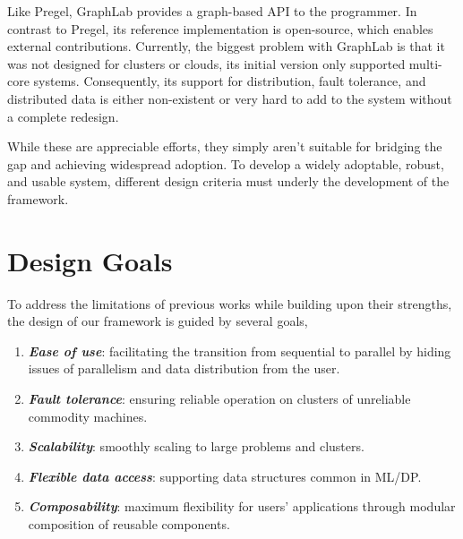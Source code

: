 \documentclass[acmtocl]{acmtrans2m}
\begin{document}
Like Pregel, GraphLab provides a graph-based API to the programmer. In contrast to Pregel, its reference implementation is open-source, which enables external contributions. Currently, the biggest problem with GraphLab is that it was not designed for clusters or clouds, its initial version only supported multi-core systems. Consequently, its support for distribution, fault tolerance, and distributed data is either non-existent or very hard to add to the system without a complete redesign.

While these are appreciable efforts, they simply aren't suitable for bridging the gap and achieving widespread adoption. To develop a widely adoptable, robust, and usable system, different design criteria must underly the development of the framework.



\section{Design Goals}

To address the limitations of previous works while building upon their strengths, the design of our framework is guided by several goals,
\begin{enumerate}
\item {\bf \em Ease of use}: facilitating the transition from sequential to parallel by hiding issues of parallelism and data distribution from the user.
\item {\bf \em Fault tolerance}: ensuring reliable operation on clusters of unreliable commodity machines.
\item {\bf \em Scalability}: smoothly scaling to large problems and clusters.
\item {\bf \em Flexible data access}: supporting data structures common in ML/DP.
\item {\bf \em Composability}: maximum flexibility for users' applications through modular composition of reusable components.
\end{enumerate}
\end{document}
